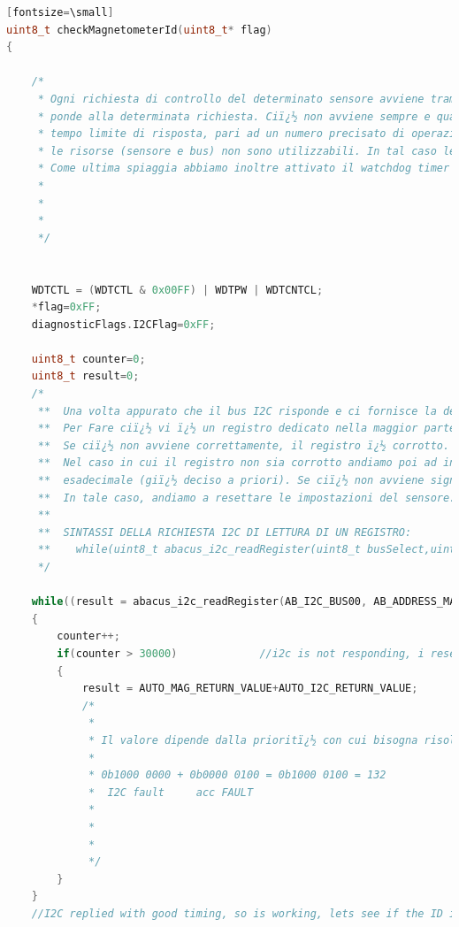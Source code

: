 \documentclass[LaM,binding=0.6cm]{../sapthesis}
\begin{document}
\begin{lstlisting}[language=c][fontsize=\small]
uint8_t checkMagnetometerId(uint8_t* flag)
{

    /*
     * Ogni richiesta di controllo del determinato sensore avviene tramite protocollo I2C. Questo protocollo si svolge in due parti: prima si richiede la determinata risorsa, poi il sensore ris
     * ponde alla determinata richiesta. Ciï¿½ non avviene sempre e qualcosa puï¿½ andare storto (sensore rotto, bus I2C non funzionante). Per evitare che il codice si blocchi imponiamo quindi un
     * tempo limite di risposta, pari ad un numero precisato di operazioni. Se il contatore raggiunge il limite, significa che il bus non risponde e di conseguenza bisogna supporre che entrambe
     * le risorse (sensore e bus) non sono utilizzabili. In tal caso le flag a byte rimangono alte e dopo un software reset obbligato le risorse vengono escluse o il problema viene risolto.
     * Come ultima spiaggia abbiamo inoltre attivato il watchdog timer che ci permette di non bloccare il codice nel caso in cui tutta la procedura venga bloccata da un evento inaspettato.
     *
     *
     *
     */


    WDTCTL = (WDTCTL & 0x00FF) | WDTPW | WDTCNTCL;
    *flag=0xFF;
    diagnosticFlags.I2CFlag=0xFF;

    uint8_t counter=0;
    uint8_t result=0;
    /*
     **  Una volta appurato che il bus I2C risponde e ci fornisce la determinata risorsa, bisogna valutare che i registri non siano corrotti.
     **  Per Fare ciï¿½ vi ï¿½ un registro dedicato nella maggior parte dei sensori chiamato "Device ID" che ci permette di leggere il nome del sensore.
     **  Se ciï¿½ non avviene correttamente, il registro ï¿½ corrotto.
     **  Nel caso in cui il registro non sia corrotto andiamo poi ad indagare il registro di configurazione, il quale deve essere impostato secondo un determinato valore
     **  esadecimale (giï¿½ deciso a priori). Se ciï¿½ non avviene significa che qualcosa ï¿½ cambiato e ciï¿½ ï¿½ inaspettato.
     **  In tale caso, andiamo a resettare le impostazioni del sensore.
     **
     **  SINTASSI DELLA RICHIESTA I2C DI LETTURA DI UN REGISTRO:
     **    while(uint8_t abacus_i2c_readRegister(uint8_t busSelect,uint8_t address, uint8_t reg)
     */

    while((result = abacus_i2c_readRegister(AB_I2C_BUS00, AB_ADDRESS_MAGNETOMETER, HMC5883IDREG_A))==0x00)
    {
        counter++;
        if(counter > 30000)             //i2c is not responding, i reset, so i set both acc and i2c not working to be sure
        {
            result = AUTO_MAG_RETURN_VALUE+AUTO_I2C_RETURN_VALUE;
            /*
             *
             * Il valore dipende dalla prioritï¿½ con cui bisogna risolvere il problema: questo identifica che sia il bus IC che l'accelerometro sono non funzionanti:
             *
             * 0b1000 0000 + 0b0000 0100 = 0b1000 0100 = 132
             *  I2C fault     acc FAULT
             *
             *
             *
             */
        }
    }
    //I2C replied with good timing, so is working, lets see if the ID is correct


\end{lstlisting}
\end{document}
